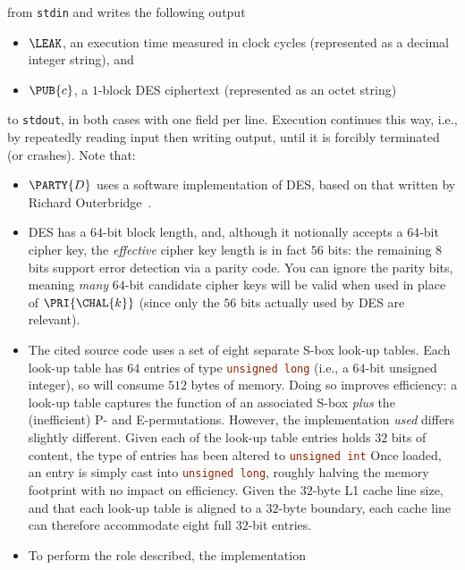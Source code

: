\documentclass[crop={false},multi={true},tikz={true}]{standalone}
\begin{document}
\noindent
from \lstinline[language={bash}]{stdin} and writes the following output

\begin{itemize}
\item $\LEAK$,
      an execution time measured in clock cycles
      (represented as a  decimal integer string),
      and
\item $\PUB{c}$,
      a  ${1}$-block DES ciphertext
      (represented as an           octet string)
\end{itemize}

\noindent
to \lstinline[language={bash}]{stdout}, in both cases with one field per 
line.  Execution continues this way, i.e., by repeatedly reading input 
then writing output, until it is forcibly terminated (or crashes).  
Note that:

\begin{itemize}
\item $\PARTY{D}$ uses a software implementation of DES, based on that
      written by Richard Outerbridge~\cite[Part V]{SCALE:Schneier:06}.
\item DES has a $64$-bit block length, and, although it notionally accepts 
      a $64$-bit cipher key, the {\em effective} cipher key length is in
      fact $56$ bits: the remaining $8$ bits support error detection via 
      a parity code.  You can ignore the parity bits, meaning {\em many}
      $64$-bit candidate cipher keys will be valid when used in place of 
      $\PRI{\CHAL{k}}$ (since only the $56$ bits actually used by DES are 
      relevant).
\item The cited source code uses a set of eight separate S-box look-up 
      tables.  Each look-up table has $64$ entries of type 
      \lstinline[language=C]{unsigned long} 
      (i.e., a $64$-bit unsigned integer), so will consume $512$ bytes 
      of memory.  Doing so improves efficiency: a look-up table captures 
      the function of an associated S-box {\em plus} the (inefficient) 
      P- and E-permutations.
      However, the implementation {\em used} differs slightly different.  
      Given each of the look-up table entries holds $32$ bits of content, 
      the type of entries has been altered to 
      \lstinline[language=C]{unsigned int} 
      Once loaded, an entry is simply cast into 
      \lstinline[language=C]{unsigned long},
      roughly halving the memory footprint with no impact on efficiency.
      Given the $32$-byte L1 cache line size, and that each look-up table 
      is aligned to a $32$-byte boundary, each cache line can therefore 
      accommodate eight full $32$-bit entries.
\item To perform the role described, the implementation


\end{itemize}
\end{document}
